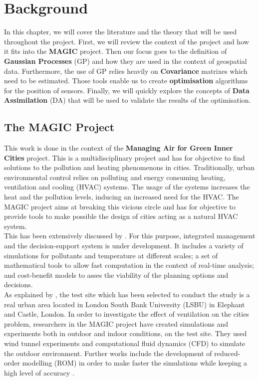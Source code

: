 \chapter{Background}

In this chapter, we will cover the literature and the theory that will be used throughout the project. First, we will review the context of the project and how it fits into the \textbf{MAGIC} project. Then our focus goes to the definition of \textbf{Gaussian Processes} (GP) and how they are used in the context of geospatial data. Furthermore, the use of GP relies heavily on \textbf{Covariance} matrixes which need to be estimated. Those tools enable us to create \textbf{optimisation} algorithms for the position of sensors. Finally, we will quickly explore the concepts of \textbf{Data Assimilation} (DA) that will be used to validate the results of the optimisation. 

\section{The MAGIC Project}

This work is done in the context of the \textbf{Managing Air for Green Inner Cities} project. This is a multidisciplinary project and has for objective to find solutions to the pollution and heating phenomenons in cities. Traditionally, urban environmental control relies on polluting and energy consuming heating, ventilation and cooling (HVAC) systems. The usage of the systems increases the heat and the pollution levels, inducing an increased need for the HVAC. The MAGIC project aims at breaking this vicious circle and has for objective to provide tools to make possible the design of cities acting as a natural HVAC system. \\


This has been extensively discussed by  \cite{song_natural_2018}.  For this purpose, integrated management and the decision-support system is under development. It includes a variety of simulations for pollutants and temperature at different scales; a set of mathematical tools to allow fast computation in the context of real-time analysis; and cost-benefit models to asses the viability of the planning options and decisions. \\

As explained by \cite{song_natural_2018}, the test site which has been selected to conduct the study is a real urban area located in London South Bank University (LSBU) in  Elephant and Castle, London. In order to investigate the effect of ventilation on the cities problem, researchers in the MAGIC project have created simulations and experiments both in outdoor and indoor conditions, on the test site. They used wind tunnel experiments and computational fluid dynamics (CFD) to simulate the outdoor environment. Further works include the development of reduced-order modelling (ROM) in order to make faster the simulations while keeping a high level of accuracy \citep{arcucci_effective_2018}. \\

